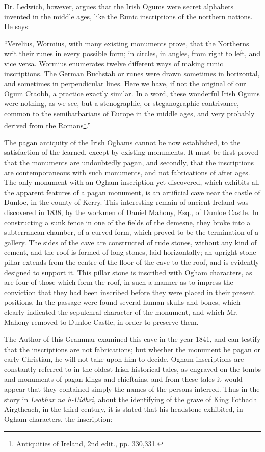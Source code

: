 \documentclass[11pt,oneside]{memoir}
\begin{document}
Dr. Ledwich, however, argues that the Irish Ogums were secret alphabets invented in the middle ages, like the Runic inscriptions of the northern nations.
He says:

``Verelius, Wormius, with many existing monuments prove, that the Northerns writ their runes in every possible form; in circles, in angles, from right to left, and vice versa.
Wormius enumerates twelve different ways of making runic inscriptions.
The German Buchstab or runes were drawn sometimes in horizontal, and sometimes in perpendicular lines.
Here we have, if not the original of our Ogum Craobh, a practice exactly similar.
In a word, these wonderful Irish Ogums were nothing, as we see, but a stenographic, or steganographic contrivance, common to the semibarbarians of Europe in the middle ages, and very probably derived from the Romans\footnote{
    Antiquities of Ireland, 2nd edit., pp. 330,331.
}.'' 

The pagan antiquity of the Irish Oghams cannot be now established, to the satisfaction of the learned, except by existing monuments.
It must be first proved that the monuments are undoubtedly pagan, and secondly, that the inscriptions are contemporaneous with such monuments, and not fabrications of after ages.
The only monument with an Ogham inscription yet discovered, which exhibits all the apparent features of a pagan monument, is an artificial cave near the castle of Dunloe, in the county of Kerry.
This interesting remain of ancient Ireland was discovered in 1838, by the workmen of Daniel Mahony, Esq., of Dunloe Castle.
In constructing a sunk fence in one of the fields of the demesne, they broke into a subterranean chamber, of a curved form, which proved to be the termination of a gallery.
The sides of the cave are constructed of rude stones, without any kind of cement, and the roof is formed of long stones, laid horizontally; an upright stone pillar extends from the centre of the floor of the cave to the roof, and is evidently designed to support it.
This pillar stone is inscribed with Ogham characters, as are four of those which form the roof, in such a manner as to impress the conviction that they had been inscribed before they were placed in their present positions.
In the passage were found several human skulls and bones, which clearly indicated the sepulchral character of the monument, and which Mr. Mahony removed to Dunloe Castle, in order to preserve them. 

The Author of this Grammar examined this cave in the year 1841, and can testify that the inscriptions are not fabrications; but whether the monument be pagan or early Christian, he will not take upon him to decide.
Ogham inscriptions are constantly referred to in the oldest Irish historical tales, as engraved on the tombs and monuments of pagan kings and chieftains, and from these tales it would appear that they contained simply the names  of the persons interred.
Thus in the story in \textit{Leabhar na h-Uidhri}, about the identifying of the grave of King Fothadh Airgtheach, in the third century, it is stated that his headstone exhibited, in Ogham characters, the inscription: 
\end{document}
